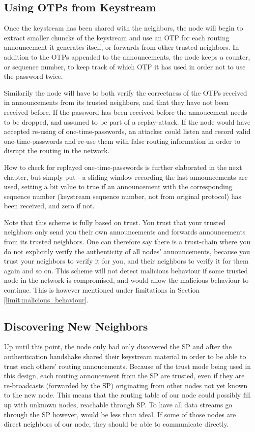 \subsection{Using \acfp{OTP} from Keystream}
Once the keystream has been shared with the neighbors, the node will begin to
extract smaller chuncks of the keystream and use an \ac{OTP} for each
routing announcement it generates itself, or forwards from other trusted
neighbors. In addition to the \acp{OTP} appended to the announcements,
the node keeps a counter, or sequence number, to keep track of which
\ac{OTP} it has used in order not to use the password twice.

Similarily the node will have to both verify the correctness of the \acp{OTP}
received in announcements from its trusted neighbors, and that they have not
been received before. If the password has been received before the annoucement
needs to be dropped, and assumed to be part of a replay-attack. If the node
would have accepted re-using of one-time-passwords, an attacker could listen
and record valid one-time-passwords and re-use them with false routing
information in order to disrupt the routing in the network.

How to check for replayed one-time-passwords is further elaborated in the next
chapter, but simply put - a sliding window recording the last announcements are
used, setting a bit value to true if an announcement with the corresponding
sequence number (keystream sequence number, not from original protocol) has been
received, and zero if not.

Note that this scheme is fully based on trust. You trust that your trusted
neighbors only send you their own announcements and forwards announcements from
its trusted neighbors. One can therefore say there is a trust-chain where you do
not explicitly verify the authenticity of all nodes' announcements, because you
trust your neighbors to verify it for you, and their neighbors to verify it for
them again and so on. This scheme will not detect malicious behaviour if some
trusted node in the network is compromised, and would allow the malicious
behaviour to continue. This is however mentioned under limitations in Section
\ref{limit:malicious_behaviour}.

\subsection{Discovering New Neighbors}
Up until this point, the node only had only discovered the \ac{SP} and after the
authentication handshake shared their keystream material in order to be able to
trust each others' routing annoucements. Because of the trust mode being used in
this design, each routing annoucement from the \ac{SP} are trusted, even if they
are re-broadcasts (forwarded by the SP) originating from other nodes not yet
known to the new node. This means that the routing table of our node could
possibly fill up with unknown nodes, reachable through \ac{SP}. To have all
data streams go through the \ac{SP} however, would be less than ideal. If some
of those nodes are direct neighbors of our node, they should be able to
communicate directly.

